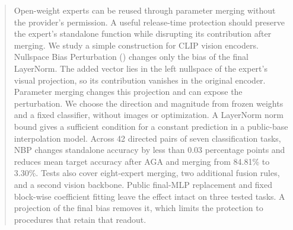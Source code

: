 \begin{abstract}
Open-weight experts can be reused through parameter merging without the provider's permission. A useful release-time protection should preserve the expert's standalone function while disrupting its contribution after merging. We study a simple construction for CLIP vision encoders. Nullspace Bias Perturbation (\method) changes only the bias of the final LayerNorm. The added vector lies in the left nullspace of the expert's visual projection, so its contribution vanishes in the original encoder. Parameter merging changes this projection and can expose the perturbation. We choose the direction and magnitude from frozen weights and a fixed classifier, without images or optimization. A LayerNorm norm bound gives a sufficient condition for a constant prediction in a public-base interpolation model. Across 42 directed pairs of seven classification tasks, NBP changes standalone accuracy by less than 0.03 percentage points and reduces mean target accuracy after AGA and merging from 84.81\% to 3.30\%. Tests also cover eight-expert merging, two additional fusion rules, and a second vision backbone. Public final-MLP replacement and fixed block-wise coefficient fitting leave the effect intact on three tested tasks. A projection of the final bias removes it, which limits the protection to procedures that retain that readout.
\end{abstract}
